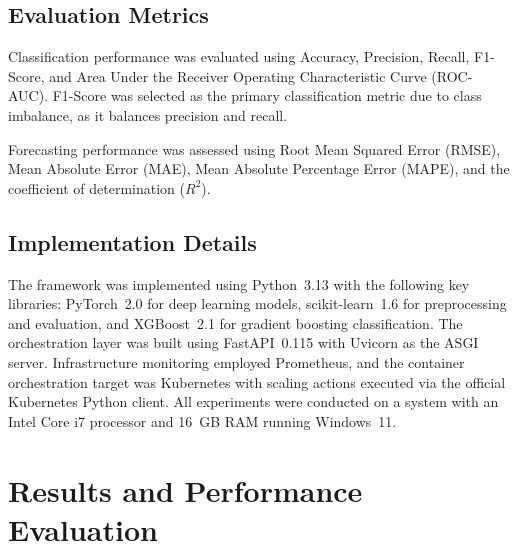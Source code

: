 \documentclass[sn-nature]{sn-jnl}
\theoremstyle{thmstyleone}
\theoremstyle{thmstyletwo}
\theoremstyle{thmstylethree}
\begin{document}
\subsection{Evaluation Metrics}\label{subsec:metrics}

Classification performance was evaluated using Accuracy, Precision, Recall, F1-Score, and Area Under the Receiver Operating Characteristic Curve (ROC-AUC).
F1-Score was selected as the primary classification metric due to class imbalance, as it balances precision and recall.

Forecasting performance was assessed using Root Mean Squared Error (RMSE), Mean Absolute Error (MAE), Mean Absolute Percentage Error (MAPE), and the coefficient of determination ($R^2$).

\subsection{Implementation Details}\label{subsec:implementation}

The framework was implemented using Python~3.13 with the following key libraries: PyTorch~2.0 for deep learning models, scikit-learn~1.6 for preprocessing and evaluation, and XGBoost~2.1 for gradient boosting classification.
The orchestration layer was built using FastAPI~0.115 with Uvicorn as the ASGI server.
Infrastructure monitoring employed Prometheus, and the container orchestration target was Kubernetes with scaling actions executed via the official Kubernetes Python client.
All experiments were conducted on a system with an Intel Core i7 processor and 16~GB RAM running Windows~11.

\section{Results and Performance Evaluation}\label{sec:results}
\end{document}
